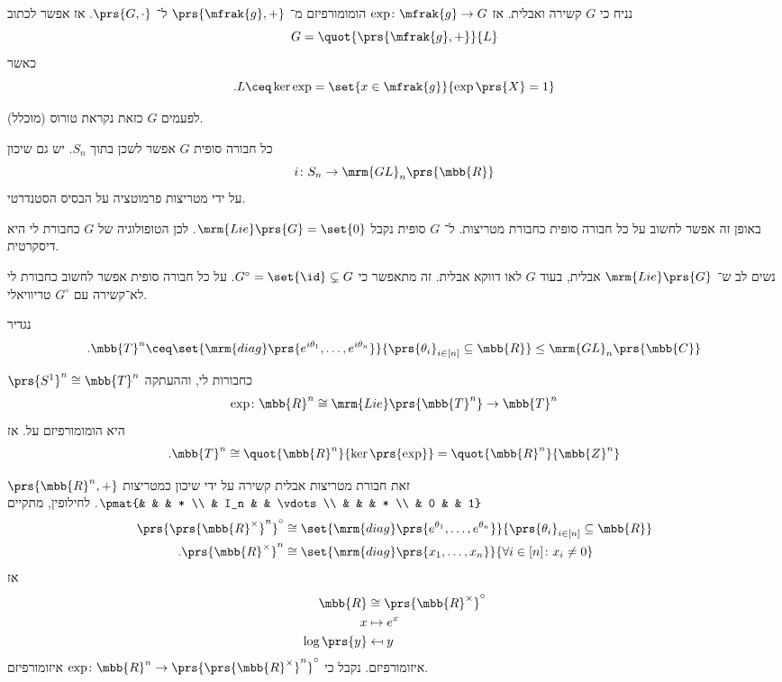 \documentclass[10pt, twoside]{book}
\begin{document}
\begin{remark}
נניח כי
$G$
קשירה ואבלית. אז
$\exp \colon \mfrak{g} \to G$
הומומורפיזם מ־%
$\prs{\mfrak{g}, +}$
ל־%
$\prs{G, \cdot}$.
אז אפשר לכתוב
\[G = \quot{\prs{\mfrak{g}, +}}{L}\]
כאשר
\[\text{.} L \ceq \ker \exp = \set{x \in \mfrak{g}}{\exp\prs{X} = 1}\]

לפעמים
$G$
כזאת נקראת טורוס (מוכלל).
\end{remark}


\begin{remark}
כל חבורה סופית
$G$
אפשר לשכן בתוך
$S_n$.
יש גם שיכון
\[i \colon S_n \to \mrm{GL}_n\prs{\mbb{R}}\]
על ידי מטריצות פרמוטציה על הבסיס הסטנדרטי.

באופן זה אפשר לחשוב על כל חבורה סופית כחבורת מטריצות. ל־%
$G$
סופית נקבל
$\mrm{Lie}\prs{G} = \set{0}$.
לכן הטופולוגיה של
$G$
כחבורת לי היא דיסקרטית.

נשים לב ש־%
$\mrm{Lie}\prs{G}$
אבלית, בעוד
$G$
לאו דווקא אבלית. זה מתאפשר כי
$G^\circ = \set{\id} \subsetneq G$.
על כל חבורה סופית אפשר לחשוב כחבורת לי לא־קשירה עם
$G^\circ$
טריוויאלי.
\end{remark}

\begin{definition}
נגדיר
\[\text{.} \mbb{T}^n \ceq \set{\mrm{diag}\prs{e^{i \theta_1}, \ldots, e^{i \theta_n}}}{\prs{\theta_i}_{i \in [n]} \subseteq \mbb{R}} \leq \mrm{GL}_n\prs{\mbb{C}}\]
\end{definition}

\begin{remark}
$\prs{S^1}^n \cong \mbb{T}^n$
כחבורות לי, וההעתקה
\begin{align*}
\exp \colon \mbb{R}^n \cong \mrm{Lie}\prs{\mbb{T}^n} &\to \mbb{T}^n \\
\end{align*}
היא הומומורפיזם על.
אז
\[\text{.}\mbb{T}^n \cong \quot{\mbb{R}^n}{\ker\prs{\exp}} = \quot{\mbb{R}^n}{\mbb{Z}^n}\]
\end{remark}

\begin{example}
$\prs{\mbb{R}^n, +}$
זאת חבורת מטריצות אבלית קשירה על ידי שיכון כמטריצות
$\pmat{& & & * \\ & I_n & & \vdots \\ & & & * \\ & 0 & & 1}$.
לחילופין, מתקיים
\begin{align*}
\prs{\prs{\mbb{R}^\times}^n}^\circ &\cong \set{\mrm{diag}\prs{e^{\theta_1}, \ldots, e^{\theta_n}}}{\prs{\theta_i}_{i \in [n]} \subseteq \mbb{R}} \\
\text{.} \prs{\mbb{R}^\times}^n &\cong \set{\mrm{diag}\prs{x_1, \ldots, x_n}}{\forall i \in [n] \colon x_i \neq 0}
\end{align*}
אז
\begin{align*}
\mbb{R} &\cong \prs{\mbb{R}^\times}^\circ \\
x &\mapsto e^x \\
\log\prs{y} &\mapsfrom y
\end{align*}
איזומורפיזם.
נקבל כי
$\exp \colon \mbb{R}^n \to \prs{\prs{\mbb{R}^\times}^n}^\circ$
איזומורפיזם.
\end{example}
\end{document}
